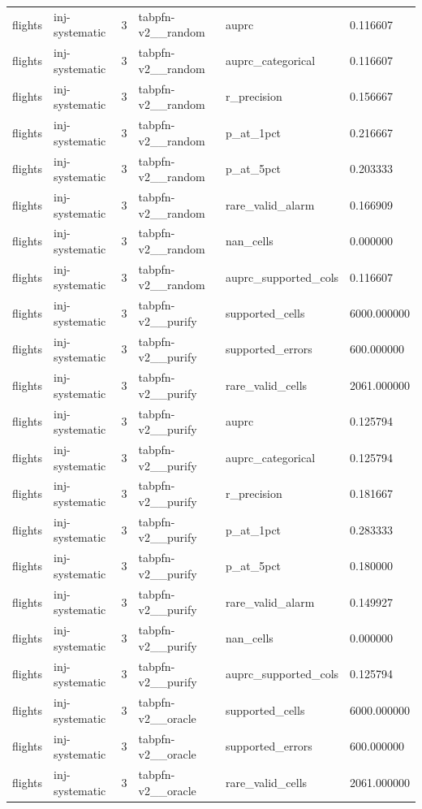 \begin{tabular}{llllll}
flights & inj-systematic & 3 & tabpfn-v2\_\_random & auprc & 0.116607 \\
flights & inj-systematic & 3 & tabpfn-v2\_\_random & auprc\_categorical & 0.116607 \\
flights & inj-systematic & 3 & tabpfn-v2\_\_random & r\_precision & 0.156667 \\
flights & inj-systematic & 3 & tabpfn-v2\_\_random & p\_at\_1pct & 0.216667 \\
flights & inj-systematic & 3 & tabpfn-v2\_\_random & p\_at\_5pct & 0.203333 \\
flights & inj-systematic & 3 & tabpfn-v2\_\_random & rare\_valid\_alarm & 0.166909 \\
flights & inj-systematic & 3 & tabpfn-v2\_\_random & nan\_cells & 0.000000 \\
flights & inj-systematic & 3 & tabpfn-v2\_\_random & auprc\_supported\_cols & 0.116607 \\
flights & inj-systematic & 3 & tabpfn-v2\_\_purify & supported\_cells & 6000.000000 \\
flights & inj-systematic & 3 & tabpfn-v2\_\_purify & supported\_errors & 600.000000 \\
flights & inj-systematic & 3 & tabpfn-v2\_\_purify & rare\_valid\_cells & 2061.000000 \\
flights & inj-systematic & 3 & tabpfn-v2\_\_purify & auprc & 0.125794 \\
flights & inj-systematic & 3 & tabpfn-v2\_\_purify & auprc\_categorical & 0.125794 \\
flights & inj-systematic & 3 & tabpfn-v2\_\_purify & r\_precision & 0.181667 \\
flights & inj-systematic & 3 & tabpfn-v2\_\_purify & p\_at\_1pct & 0.283333 \\
flights & inj-systematic & 3 & tabpfn-v2\_\_purify & p\_at\_5pct & 0.180000 \\
flights & inj-systematic & 3 & tabpfn-v2\_\_purify & rare\_valid\_alarm & 0.149927 \\
flights & inj-systematic & 3 & tabpfn-v2\_\_purify & nan\_cells & 0.000000 \\
flights & inj-systematic & 3 & tabpfn-v2\_\_purify & auprc\_supported\_cols & 0.125794 \\
flights & inj-systematic & 3 & tabpfn-v2\_\_oracle & supported\_cells & 6000.000000 \\
flights & inj-systematic & 3 & tabpfn-v2\_\_oracle & supported\_errors & 600.000000 \\
flights & inj-systematic & 3 & tabpfn-v2\_\_oracle & rare\_valid\_cells & 2061.000000 \\

\end{tabular}

